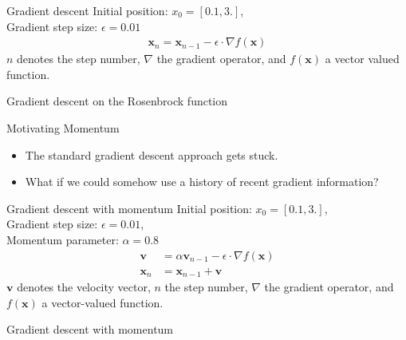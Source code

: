 \documentclass[notes]{beamer}
\begin{document}
    \begin{frame}{Gradient descent}
      Initial position: $x_0 = [0.1, 3.]$, \\
      Gradient step size: $\epsilon = 0.01 $
      \begin{align}
        \mathbf{x}_n = \mathbf{x}_{n-1} - \epsilon \cdot \nabla f(\mathbf{x})
      \end{align}
      $n$ denotes the step number, $\nabla$ the gradient operator, and $f(\mathbf{x})$ a vector valued function.
    \end{frame}

    \begin{frame}{Gradient descent on the Rosenbrock function}
      \centering
    \end{frame}

    \begin{frame}{Motivating Momentum}
      \begin{itemize}
        \item The standard gradient descent approach gets stuck.
        \item What if we could somehow use a history of recent gradient information?
      \end{itemize}
    \end{frame}

    \begin{frame}{Gradient descent with momentum}
      Initial position: $x_0 = [0.1, 3.]$, \\
      Gradient step size: $\epsilon = 0.01 $, \\
      Momentum parameter: $\alpha = 0.8$
      \begin{align}
        \mathbf{v} &= \alpha \mathbf{v}_{n-1} - \epsilon \cdot \nabla f(\mathbf{x}) \\
        \mathbf{x}_n &= \mathbf{x}_{n-1} + \mathbf{v}
      \end{align}
      $\mathbf{v}$ denotes the velocity vector, 
      $n$ the step number, $\nabla$ the gradient operator, and $f(\mathbf{x})$ a vector-valued function.
    \end{frame}


    \begin{frame}{Gradient descent with momentum}
      \centering
    \end{frame}
\end{document}
